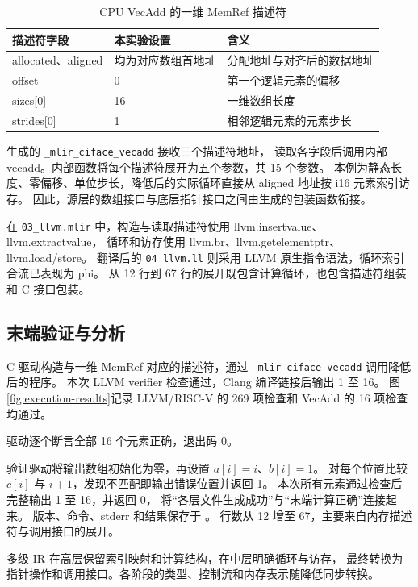 \begin{table}[htbp]
\centering\small
\caption{CPU VecAdd 的一维 MemRef 描述符}
\begin{tabular}{lll}
\toprule
描述符字段 & 本实验设置 & 含义\\
\midrule
allocated、aligned & 均为对应数组首地址 & 分配地址与对齐后的数据地址\\
offset & 0 & 第一个逻辑元素的偏移\\
sizes[0] & 16 & 一维数组长度\\
strides[0] & 1 & 相邻逻辑元素的元素步长\\
\bottomrule
\end{tabular}
\end{table}

生成的 \texttt{\_mlir\_ciface\_vecadd} 接收三个描述符地址，
读取各字段后调用内部 vecadd。内部函数将每个描述符展开为五个参数，共 15 个参数。
本例为静态长度、零偏移、单位步长，降低后的实际循环直接从 aligned 地址按 i16 元素索引访存。
因此，源层的数组接口与底层指针接口之间由生成的包装函数衔接。

在 \texttt{03\_llvm.mlir} 中，构造与读取描述符使用 llvm.insertvalue、llvm.extractvalue，
循环和访存使用 llvm.br、llvm.getelementptr、llvm.load/store。
翻译后的 \texttt{04\_llvm.ll} 则采用 LLVM 原生指令语法，循环索引合流已表现为 phi。
从 12 行到 67 行的展开既包含计算循环，也包含描述符组装和 C 接口包装。

\subsection{末端验证与分析}
C 驱动构造与一维 MemRef 对应的描述符，通过
\texttt{\_mlir\_ciface\_vecadd} 调用降低后的程序。
本次 LLVM verifier 检查通过，Clang 编译链接后输出 1 至 16。
图\ref{fig:execution-results}记录 LLVM/RISC-V 的 269 项检查和 VecAdd 的 16 项检查均通过。


驱动逐个断言全部 16 个元素正确，退出码 0。

验证驱动将输出数组初始化为零，再设置 $a[i]=i$、$b[i]=1$。
对每个位置比较 $c[i]$ 与 $i+1$，发现不匹配即输出错误位置并返回 1。
本次所有元素通过检查后完整输出 1 至 16，并返回 0，
将“各层文件生成成功”与“末端计算正确”连接起来。
版本、命令、stderr 和结果保存于 。
行数从 12 增至 67，主要来自内存描述符与调用接口的展开。

多级 IR 在高层保留索引映射和计算结构，在中层明确循环与访存，
最终转换为指针操作和调用接口。各阶段的类型、控制流和内存表示随降低同步转换。
